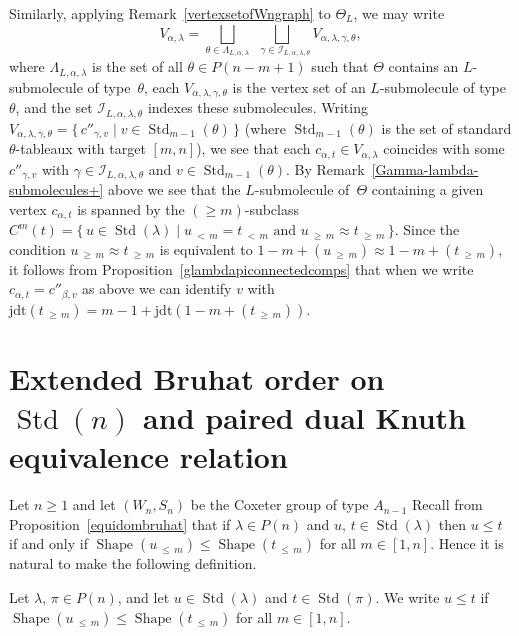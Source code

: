 \documentclass[ALCO,ThmDefs,Unicode,epreuves]{cedram}
\newcommand{\lessthan}[2]{#1\,{_{<\,#2}}}
\newcommand{\Lessthan}[2]{#1\,{_{\leqslant\,#2}}}
\newcommand{\Morethan}[2]{#1\,{_{\geqslant\,#2}}}
\newcommand{\jdt}{\mathrm{jdt}}
\DeclareMathOperator{\STD}{Std}
\DeclareMathOperator{\shape}{Shape}
\begin{document}
\begin{rema}
Similarly, applying Remark~\ref{vertexsetofWngraph} to $\Theta_L$,
we may write
\[
V_{\alpha,\lambda}=\bigsqcup_{\theta\in\Lambda_{L,\alpha,\lambda}}
\bigsqcup_{\,\,\,\,\gamma\in\mathcal{I}_{L,\alpha,\lambda,\theta}\!\!\!\!}\!\!V_{\alpha,\lambda,\gamma,\theta},
\]
where $\Lambda_{L,\alpha,\lambda}$ is the set of all $\theta\in P(n-m+1)$ such
that $\Theta$ contains an $L$-submolecule of type~$\theta$, each
$V_{\alpha,\lambda,\gamma,\theta}$ is the vertex set of an $L$-submolecule
of type~$\theta$, and the set $\mathcal I_{L,\alpha,\lambda,\theta}$ indexes
these submolecules. Writing
$V_{\alpha,\lambda,\gamma,\theta}=\{\,c''_{\gamma,v}\mid v\in\STD_{m-1}(\theta)\,\}$
(where $\STD_{m-1}(\theta)$ is the set of standard $\theta$-tableaux with target
$[m,n]$), we see that each $c_{\alpha,t}\in V_{\alpha,\lambda}$ coincides
with some $c''_{\gamma,v}$ with $\gamma\in\mathcal I_{L,\alpha,\lambda,\theta}$
and $v\in\STD_{m-1}(\theta)$.
By Remark~\ref{Gamma-lambda-submolecules+} above we see that the
$L$-submolecule of~$\Theta$ containing a given vertex $c_{\alpha,t}$ is
spanned by the $(\geqslant m)$-subclass
$C^m(t) = \{\,u\in\STD(\lambda) \mid\lessthan um = \lessthan tm
\text{ and } \Morethan um\approx \Morethan tm\,\}$.
Since the condition $\Morethan um\approx\Morethan tm$ is equivalent to
$1-m + (\Morethan um)\approx 1-m+ (\Morethan tm)$, it follows from
Proposition~\ref{glambdapiconnectedcomps} that
when we write $c_{\alpha,t}=c''_{\beta,v}$
as above we can identify $v$ with~$\jdt(\Morethan tm)=m-1+\jdt(1-m+(\Morethan tm))$.
\end{rema}

\section{Extended Bruhat order on \texorpdfstring{$\STD(n)$}{Std(n)} and paired dual Knuth equivalence relation}
\label{sec:8}

Let $n\geqslant 1$ and let $(W_n,S_n)$ be the Coxeter group of type $A_{n-1}$
Recall from Proposition~\ref{equidombruhat}
that if $\lambda\in P(n)$ and $u,\,t\in\STD(\lambda)$ then $u\leqslant t$
if and only if $\shape(\Lessthan um) \leqslant \shape(\Lessthan tm)$ for all $m\in [1,n]$.
Hence it is natural to make the following definition.

\begin{defi}\label{ExtDominance Order Tableaux}
Let $\lambda,\,\pi\in P(n)$, and let $u\in\STD(\lambda)$ and $t\in\STD(\pi)$.
We write $u \leqslant t$ if $\shape(\Lessthan um) \leqslant
\shape(\Lessthan tm)$ for all $m\in [1,n]$.
\end{defi}
\end{document}
